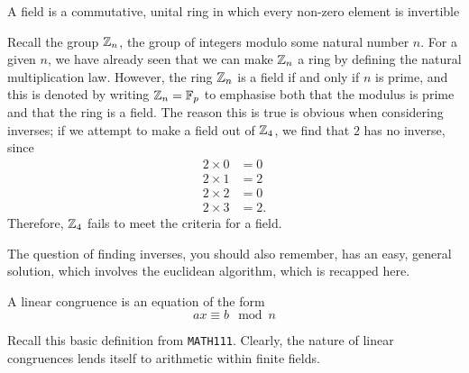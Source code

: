 \begin{definition}
	A field is a commutative, unital ring in which every non-zero element is invertible
\end{definition}
Recall the group $\zn$, the group of integers modulo some natural number $n$.
For a given $n$, we have already seen that we can make $\zn$ a ring by defining the natural multiplication law.
However, the ring $\zn$ is a field if and only if $n$ is prime, and this is denoted by writing $\zn = \fp$ to emphasise both that the modulus is prime and that the ring is a field.
The reason this is true is obvious when considering inverses; if we attempt to make a field out of $\zn[4]$, we find that $2$ has no inverse, since
\begin{align*}
	2 \times 0 &= 0\\
	2 \times 1 &= 2\\
	2 \times 2 &= 0\\
	2 \times 3 &= 2.
\end{align*}
Therefore, $\zn[4]$ fails to meet the criteria for a field.

The question of finding inverses, you should also remember, has an easy, general solution, which involves the euclidean algorithm, which is recapped here.
\begin{definition}
	A linear congruence is an equation of the form
	$$ax \equiv b \mod n$$
\end{definition}
Recall this basic definition from \texttt{MATH111}. Clearly, the nature of linear congruences lends itself to arithmetic within finite fields.
